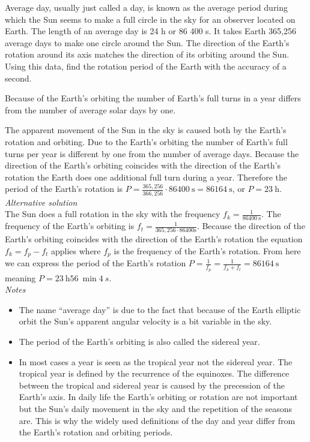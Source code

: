 {\ifEngStatement
Average day, usually just called a day, is known as the average period during which the Sun seems to make a full circle in the sky for an observer located on Earth. The length of an average day is 24 h or 86 400 s. It takes Earth 365,256 average days to make one circle around the Sun. The direction of the Earth’s rotation around its axis matches the direction of its orbiting around the Sun. Using this data, find the rotation period of the Earth with the accuracy of a second.
\fi


\ifEngHint
Because of the Earth’s orbiting the number of Earth’s full turns in a year differs from the number of average solar days by one.
\fi


\ifEngSolution
The apparent movement of the Sun in the sky is caused both by the Earth’s rotation and orbiting. Due to the Earth’s orbiting the number of Earth’s full turns per year is different by one from the number of average days. Because the direction of the Earth’s orbiting coincides with the direction of the Earth’s rotation the Earth does one additional full turn during a year. Therefore the period of the Earth’s rotation is $P=\frac{365,256}{366,256} \cdot \SI{86400}{\second}=\SI{86164}{\second}$, or $P=\SI{23}{\hour}$.\\

\emph{Alternative solution}\\
The Sun does a full rotation in the sky with the frequency $f_k=\frac{1}{\SI{86400}{\second}}$. The frequency of the Earth’s orbiting is $f_t=\frac{1}{365,256\cdot86400\text{s}}$. Because the direction of the Earth’s orbiting coincides with the direction of the Earth’s rotation the equation $f_k=f_p-f_t$ applies where $f_p$ is the frequency of the Earth’s rotation. From here we can express the period of the Earth’s rotation $P=\frac{1}{f_p}=\frac{1}{f_k+f_t}=\SI{86164}{\second}$ meaning $P=\SI{23}{\hour} \SI{56}{\min} \SI{4}{s}$. \\

\emph{Notes}\\
\begin{itemize}
\item The name “average day” is due to the fact that because of the Earth elliptic orbit the Sun’s apparent angular velocity is a bit variable in the sky.
\item The period of the Earth’s orbiting is also called the sidereal year.
\item In most cases a year is seen as the tropical year not the sidereal year. The tropical year is defined by the recurrence of the equinoxes. The difference between the tropical and sidereal year is caused by the precession of the Earth’s axis. In daily life the Earth’s orbiting or rotation are not important but the Sun’s daily movement in the sky and the repetition of the seasons are. This is why the widely used definitions of the day and year differ from the Earth’s rotation and orbiting periods.
\end{itemize}
\fi
}